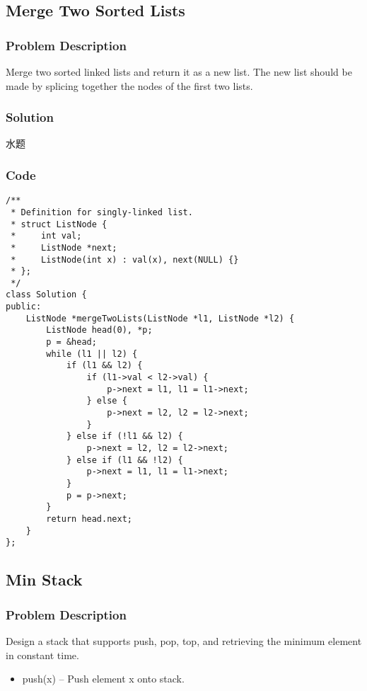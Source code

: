 \documentclass[courier]{article}
\begin{document}
\begin{CJK*}{UTF8}{gkai}
\subsection{ Merge Two Sorted Lists }

\subsubsection*{Problem Description}
Merge two sorted linked lists and return it as a new list. The new list should be made by splicing together the nodes of the first two lists.



\subsubsection*{Solution}
水题

\subsubsection*{Code}
\begin{lstlisting}
/**
 * Definition for singly-linked list.
 * struct ListNode {
 *     int val;
 *     ListNode *next;
 *     ListNode(int x) : val(x), next(NULL) {}
 * };
 */
class Solution {
public:
    ListNode *mergeTwoLists(ListNode *l1, ListNode *l2) {
        ListNode head(0), *p;
        p = &head;
        while (l1 || l2) {
            if (l1 && l2) {
                if (l1->val < l2->val) {
                    p->next = l1, l1 = l1->next;
                } else {
                    p->next = l2, l2 = l2->next;
                }
            } else if (!l1 && l2) {
                p->next = l2, l2 = l2->next;
            } else if (l1 && !l2) {
                p->next = l1, l1 = l1->next;
            }
            p = p->next;
        }
        return head.next;
    }
}; 
\end{lstlisting}


\subsection{ Min Stack }

\subsubsection*{Problem Description}
Design a stack that supports push, pop, top, and retrieving the minimum element in constant time.

\begin{itemize}
\item 
push(x) -- Push element x onto stack.


\end{itemize}
\end{CJK*}
\end{document}
